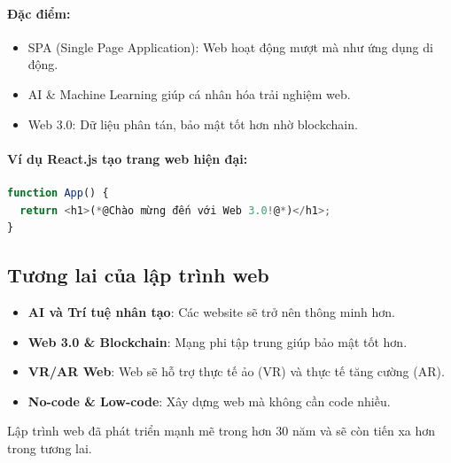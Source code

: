 \paragraph{Đặc điểm:}
\begin{itemize}
    \item SPA (Single Page Application): Web hoạt động mượt mà như ứng dụng di động.
    \item AI \& Machine Learning giúp cá nhân hóa trải nghiệm web.
    \item Web 3.0: Dữ liệu phân tán, bảo mật tốt hơn nhờ blockchain.
\end{itemize}

\paragraph{Ví dụ React.js tạo trang web hiện đại:}
\begin{codeWindow}
\begin{lstlisting}[language=JavaScript, frame=none]
function App() {
  return <h1>(*@Chào mừng đến với Web 3.0!@*)</h1>;
}
\end{lstlisting}
\end{codeWindow}

\subsection{Tương lai của lập trình web}

\begin{itemize}
    \item \textbf{AI và Trí tuệ nhân tạo}: Các website sẽ trở nên thông minh hơn.
    \item \textbf{Web 3.0 \& Blockchain}: Mạng phi tập trung giúp bảo mật tốt hơn.
    \item \textbf{VR/AR Web}: Web sẽ hỗ trợ thực tế ảo (VR) và thực tế tăng cường (AR).
    \item \textbf{No-code \& Low-code}: Xây dựng web mà không cần code nhiều.
\end{itemize}

\begin{noteBox}
Lập trình web đã phát triển mạnh mẽ trong hơn 30 năm và sẽ còn tiến xa hơn trong tương lai.
\end{noteBox}

